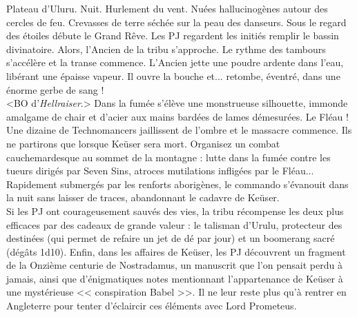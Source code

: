 \documentclass[11pt,twoside,a4paper]{book}
\begin{document}
Plateau d'Uluru. Nuit. Hurlement du vent. Nu{\'e}es hallucinog{\`e}nes autour des cercles de feu. Crevasses de terre s{\'e}ch{\'e}e sur la peau des danseurs. Sous le regard des {\'e}toiles d{\'e}bute le Grand R{\^e}ve. Les PJ regardent les initi{\'e}s remplir le bassin divinatoire. Alors, l'Ancien de la tribu s'approche. Le rythme des tambours s'acc{\'e}l{\`e}re et la transe commence. L'Ancien jette une poudre ardente dans l'eau, lib{\'e}rant une {\'e}paisse vapeur. Il ouvre la bouche et... retombe, {\'e}ventr{\'e}, dans une {\'e}norme gerbe de sang !~\\

<BO d'\emph{Hellraiser}.> Dans la fum{\'e}e s'{\'e}l{\`e}ve une monstrueuse silhouette, immonde amalgame de chair et d'acier aux mains bard{\'e}es de lames d{\'e}mesur{\'e}es. Le Fl{\'e}au ! Une dizaine de Technomancers jaillissent de l'ombre et le massacre commence. Ils ne partirons que lorsque Ke{\"u}ser sera mort. Organisez un combat cauchemardesque au sommet de la montagne : lutte dans la fum{\'e}e contre les tueurs dirig{\'e}s par Seven Sins, atroces mutilations inflig{\'e}es par le Fl{\'e}au... Rapidement submerg{\'e}s par les renforts aborig{\`e}nes, le commando s'{\'e}vanouit dans la nuit sans laisser de traces, abandonnant le cadavre de Ke{\"u}ser.~\\

Si les PJ ont courageusement sauv{\'e}s des vies, la tribu r{\'e}compense les deux plus efficaces par des cadeaux de grande valeur : le talisman d'Urulu, protecteur des destin{\'e}es (qui permet de refaire un jet de d{\'e} par jour) et un boomerang sacr{\'e} (d{\'e}g{\^a}ts 1d10). Enfin, dans les affaires de Ke{\"u}ser, les PJ d{\'e}couvrent un fragment de la Onzi{\`e}me centurie de Nostradamus, un manuscrit que l'on pensait perdu {\`a} jamais, ainsi que d'{\'e}nigmatiques notes mentionnant l'appartenance de Ke{\"u}ser {\`a} une myst{\'e}rieuse << conspiration Babel >>. Il ne leur reste plus qu'{\`a} rentrer en Angleterre pour tenter d'{\'e}claircir ces {\'e}l{\'e}ments avec Lord Prometeus.~\\
\end{document}
